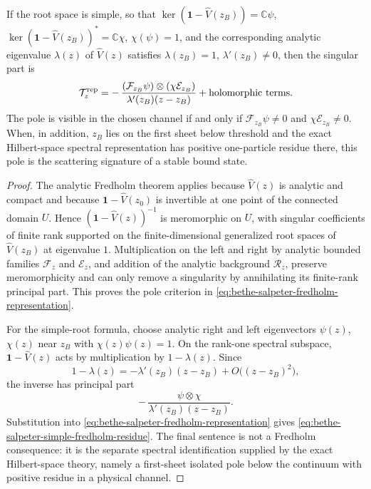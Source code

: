 \begin{theorem}
If the root space is simple, so that
\(\ker(\mathbf 1-\widehat V(z_B))=\mathbb C\psi\),
\(\ker(\mathbf 1-\widehat V(z_B))^*=\mathbb C\chi\),
\(\chi(\psi)=1\), and the corresponding analytic eigenvalue
\(\lambda(z)\) of \(\widehat V(z)\) satisfies
\(\lambda(z_B)=1\), \(\lambda'(z_B)\ne0\), then the singular part is
\begin{equation}
  \mathcal T_z^{\mathrm{rep}}
  =
  -\,\frac{(\mathcal F_{z_B}\psi)\otimes(\chi\mathcal E_{z_B})}
      {\lambda'(z_B)(z-z_B)}
  +\text{\rm holomorphic terms}.
  \label{eq:bethe-salpeter-simple-fredholm-residue}
\end{equation}
The pole is visible in the chosen channel if and only if
\(\mathcal F_{z_B}\psi\ne0\) and \(\chi\mathcal E_{z_B}\ne0\).
When, in addition, \(z_B\) lies on the first sheet below threshold and the
exact Hilbert-space spectral representation has positive one-particle residue
there, this pole is the scattering signature of a stable bound state.
\end{theorem}

\begin{proof}
The analytic Fredholm theorem applies because \(\widehat V(z)\) is analytic
and compact and because \(\mathbf 1-\widehat V(z_0)\) is invertible at one
point of the connected domain \(U\).  Hence
\((\mathbf 1-\widehat V(z))^{-1}\) is meromorphic on \(U\), with singular
coefficients of finite rank supported on the finite-dimensional generalized
root spaces of \(\widehat V(z_B)\) at eigenvalue \(1\).  Multiplication on the
left and right by analytic bounded families \(\mathcal F_z\) and
\(\mathcal E_z\), and addition of the analytic background \(\mathcal R_z\),
preserve meromorphicity and can only remove a singularity by annihilating its
finite-rank principal part.  This proves the pole criterion in
\eqref{eq:bethe-salpeter-fredholm-representation}.

For the simple-root formula, choose analytic right and left eigenvectors
\(\psi(z)\), \(\chi(z)\) near \(z_B\) with
\(\chi(z)\psi(z)=1\).  On the rank-one spectral subspace,
\(\mathbf 1-\widehat V(z)\) acts by multiplication by \(1-\lambda(z)\).
Since
\[
  1-\lambda(z)=-\lambda'(z_B)(z-z_B)+O\bigl((z-z_B)^2\bigr),
\]
the inverse has principal part
\[
  -\,\frac{\psi\otimes\chi}{\lambda'(z_B)(z-z_B)} .
\]
Substitution into \eqref{eq:bethe-salpeter-fredholm-representation} gives
\eqref{eq:bethe-salpeter-simple-fredholm-residue}.  The final sentence is not
a Fredholm consequence: it is the separate spectral identification supplied by
the exact Hilbert-space theory, namely a first-sheet isolated pole below the
continuum with positive residue in a physical channel.
\end{proof}

